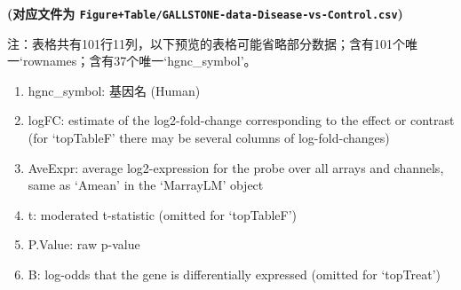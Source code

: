 \documentclass[
]{article}
\providecommand{\tightlist}{%
  \setlength{\itemsep}{0pt}\setlength{\parskip}{0pt}}
\begin{document}
\textbf{(对应文件为 \texttt{Figure+Table/GALLSTONE-data-Disease-vs-Control.csv})}

\begin{center}\begin{tcolorbox}[colback=gray!10, colframe=gray!50, width=0.9\linewidth, arc=1mm, boxrule=0.5pt]注：表格共有101行11列，以下预览的表格可能省略部分数据；含有101个唯一`rownames；含有37个唯一`hgnc\_symbol'。
\end{tcolorbox}
\end{center}
\begin{center}\begin{tcolorbox}[colback=gray!10, colframe=gray!50, width=0.9\linewidth, arc=1mm, boxrule=0.5pt]\begin{enumerate}\tightlist
\item hgnc\_symbol:  基因名 (Human)
\item logFC:  estimate of the log2-fold-change corresponding to the effect or contrast (for ‘topTableF’ there may be several columns of log-fold-changes)
\item AveExpr:  average log2-expression for the probe over all arrays and channels, same as ‘Amean’ in the ‘MarrayLM’ object
\item t:  moderated t-statistic (omitted for ‘topTableF’)
\item P.Value:  raw p-value
\item B:  log-odds that the gene is differentially expressed (omitted for ‘topTreat’)
\end{enumerate}\end{tcolorbox}
\end{center}
\end{document}
